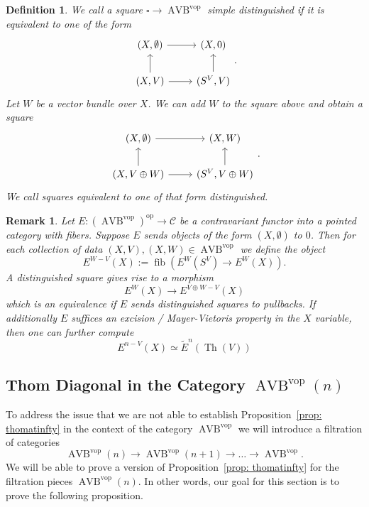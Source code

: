\documentclass{article}
\newcommand{\cC}{\mathcal{C}}
\newcommand{\op}{\mathrm{op}}
\newcommand{\vop}{\mathrm{vop}}
\DeclareMathOperator{\AVB}{AVB}
\DeclareMathOperator*{\fib}{fib}
\DeclareMathOperator{\Th}{Th}
\newtheorem{definition}{Definition}
\newtheorem{remark}{Remark}
\begin{document}
\begin{definition} 
    We call a square $\square \to \AVB^\vop$ \emph{simple distinguished} if it is equivalent to one of the 
    form 
    \[\begin{tikzcd}
        {(X,\emptyset)} & {(X,0)} \\
        {(X,V)} & {(S^V,V)}
        \arrow[from=2-1, to=1-1]
        \arrow[from=1-1, to=1-2]
        \arrow[from=2-1, to=2-2]
        \arrow[from=2-2, to=1-2]
    \end{tikzcd}.\]
    Let $W$ be a vector bundle over $X$. We can add $W$ to the square above and obtain a square 
    \[\begin{tikzcd}
        {(X,\emptyset)} & {(X,W)} \\
        {(X,V \oplus W)} & {(S^V,V \oplus W)}
        \arrow[from=2-1, to=1-1]
        \arrow[from=1-1, to=1-2]
        \arrow[from=2-1, to=2-2]
        \arrow[from=2-2, to=1-2]
    \end{tikzcd}.\]
    We call squares equivalent to one of that form \emph{distinguished}.     
\end{definition}
\begin{remark}
    Let $E \colon \left(\AVB^\vop\right)^\op \to \cC$ be a contravariant functor into a pointed category 
    with fibers. Suppose $E$ sends objects of the form $(X,\emptyset)$ to $0$. 
    Then for each collection of data $(X,V),(X,W) \in \AVB^\vop$ we define the object
    \[
        E^{W - V}(X) := \fib( E^{W}(S^V) \to E^{W}(X)).
    \]
    A distinguished square gives rise to a morphism 
    \[
        E^{W}(X) \to E^{V \oplus W - V}(X)  
    \]
    which is an equivalence if $E$ sends distinguished 
    squares to pullbacks.
    If additionally $E$ suffices an excision / Mayer-Vietoris property in the 
    $X$ variable, then one can further compute 
    \[
    E^{n - V}(X) \simeq \tilde{E}^n(\Th(V))    
    \]   
\end{remark}

\subsection{Thom Diagonal in the Category $\AVB^\vop(n)$}\label{sec:AVB(n)}

To address the issue that we are not able to establish Proposition~\ref{prop: thomatinfty}
in the context of the category $\AVB^\vop$ we will introduce a filtration of categories 
\[
  \AVB^\vop(n) \to \AVB^\vop(n+1) \to \dots \to \AVB^\vop.
\]
We will be able to prove a version of Proposition~\ref{prop: thomatinfty} for the filtration pieces $\AVB^\vop(n)$.
In other words, our goal for this section is to prove the following proposition.
\end{document}
